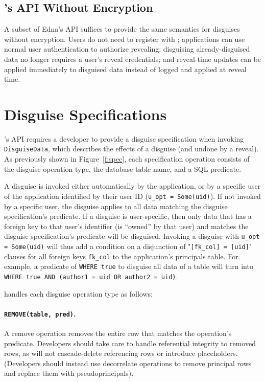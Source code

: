     
\subsection{\sys's API Without Encryption}
\label{s:noencrypt-api}
A subset of Edna's API suffices to provide the same semantics for disguises
without encryption. Users do not need to register with \sys; applications can
use normal user authentication to authorize revealing; disguising
already-disguised data no longer requires a user's reveal credentials; and
reveal-time updates can be applied immediately to disguised data instead of
logged and applied at reveal time.

\section{Disguise Specifications}
\label{s:semantics:spec}

\sys's API requires a developer to provide a disguise specification when
invoking \texttt{DisguiseData}, which describes the effects of a disguise (and
undone by a reveal).  As previously shown in Figure~\ref{f:spec}, each
specification operation consists of the disguise operation type, the database
table name, and a SQL  predicate.
%

%
A disguise is invoked either automatically by the application, or by a specific
user of the application identified by their user ID (\texttt{u\_opt =
Some(uid)}).
% 
If not invoked by a specific user, the disguise applies to all data matching the
disguise specification's predicate.
%
If a disguise is user-specific, then only data that has a foreign key to that
user's identifier (is ``owned'' by that user) and matches the disguise
specification's predicate will be disguised. Invoking a disguise with
\texttt{u\_opt = Some(uid)} will thus add a condition on a disjunction of
"\texttt{[fk\_col] = [uid]}" clauses for all foreign keys \texttt{fk\_col} to
the application's principals table. For example, a predicate of \texttt{WHERE
true} to disguise all data of a table will turn into \texttt{WHERE true AND
(author1 = uid OR author2 = uid)}.

\sys handles each disguise operation type as follows:
%

\paragraph{\texttt{REMOVE(table, pred)}.}
A remove operation removes the entire row that matches the operation's
predicate.
%
Developers should take care to handle referential integrity to removed rows, as
\sys will not cascade-delete referencing rows or introduce placeholders.
(Developers should instead use decorrelate operations to remove principal rows
and replace them with pseudoprincipals).
%

